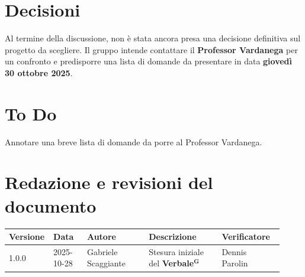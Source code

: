 \documentclass[a4paper,12pt]{article}
\newcommand{\term}[1]{\textbf{#1}$^\mathbf{G}$}
\begin{document}
\section{Decisioni}
Al termine della discussione, non è stata ancora presa una decisione definitiva sul progetto da scegliere.  
Il gruppo intende contattare il \textbf{Professor Vardanega} per un confronto e predisporre una lista di domande da presentare in data \textbf{giovedì 30 ottobre 2025}.

\section{To Do}
Annotare una breve lista di domande da porre al Professor Vardanega.

\clearpage
\section{Redazione e revisioni del documento}

\begin{center}
\small
\renewcommand{\arraystretch}{1.2} 
\begin{tabular}{|p{0.1\linewidth}|p{0.12\linewidth}|p{0.22\linewidth}|p{0.26\linewidth}|p{0.22\linewidth}|}
\hline
\rowcolor{gray!60} 
\textbf{Versione} & \textbf{Data} & \textbf{Autore} & \textbf{Descrizione} & \textbf{Verificatore} \\
\hline
\rowcolor{white}
1.0.0 & 2025-10-28 & Gabriele Scaggiante & Stesura iniziale del \term{Verbale} & Dennis Parolin \\
\hline

\end{tabular}
\end{center}
\end{document}
